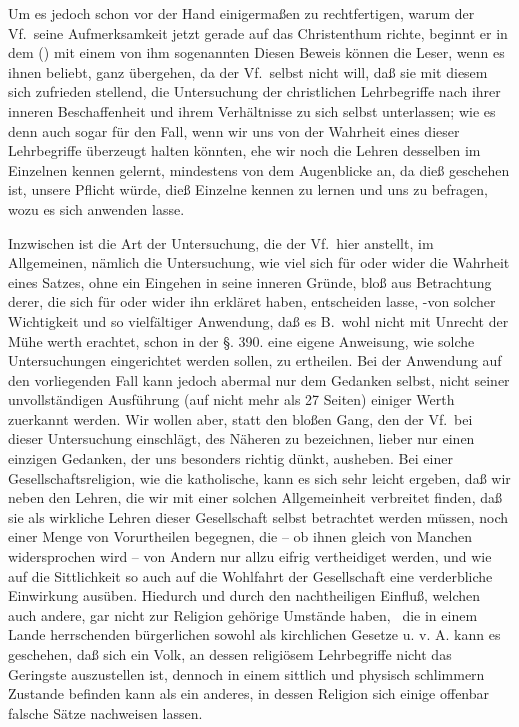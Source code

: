 Um es jedoch schon vor der Hand einigermaßen zu rechtfertigen, warum der Vf.\ seine Aufmerksamkeit jetzt gerade auf das Christenthum richte, beginnt er in dem  () mit einem von ihm sogenannten  Diesen Beweis können die Leser, wenn es ihnen beliebt, ganz übergehen, da der Vf.\ selbst nicht will, daß sie mit diesem sich zufrieden stellend, die Untersuchung der christlichen Lehrbegriffe nach ihrer inneren Beschaffenheit und ihrem Verhältnisse zu sich selbst unterlassen; wie es denn auch sogar für den Fall, wenn wir uns von der Wahrheit eines dieser Lehrbegriffe überzeugt halten könnten, ehe wir noch die Lehren desselben  im Einzelnen kennen gelernt, mindestens von dem Augenblicke an, da dieß geschehen ist, unsere Pflicht würde, dieß Einzelne kennen zu lernen und uns zu befragen, wozu es sich anwenden lasse. \par
Inzwischen ist die Art der Untersuchung, die der Vf.\ hier anstellt, im Allgemeinen, nämlich die Untersuchung, wie viel sich für oder wider die Wahrheit eines Satzes, ohne ein Eingehen in seine inneren Gründe, bloß aus Betrachtung derer, die sich für oder wider ihn erkläret haben, entscheiden lasse, -von solcher Wichtigkeit und so vielfältiger Anwendung, daß es B.\ wohl nicht mit Unrecht der Mühe werth erachtet, schon in der  §. 390. eine eigene Anweisung, wie solche Untersuchungen eingerichtet werden sollen, zu ertheilen. Bei der Anwendung auf den vorliegenden Fall kann jedoch abermal nur dem Gedanken selbst, nicht seiner unvollständigen Ausführung (auf nicht mehr als 27 Seiten) einiger Werth zuerkannt werden. Wir wollen aber, statt den bloßen Gang, den der Vf.\ bei dieser Untersuchung einschlägt, des Näheren zu bezeichnen, lieber nur einen einzigen Gedanken, der uns besonders richtig dünkt, ausheben. Bei einer Gesellschaftsreligion, wie die katholische, kann es sich sehr leicht ergeben, daß wir neben den Lehren, die wir mit einer solchen Allgemeinheit verbreitet finden, daß sie als wirkliche Lehren dieser Gesellschaft selbst betrachtet werden müssen, noch einer Menge von Vorurtheilen begegnen, die -- ob ihnen gleich von Manchen widersprochen wird -- von Andern nur allzu eifrig vertheidiget werden, und wie auf die Sittlichkeit so auch auf die Wohlfahrt der Gesellschaft eine verderbliche Einwirkung ausüben. Hiedurch und durch den nachtheiligen Einfluß, welchen auch andere, gar nicht zur Religion gehörige Umstände haben, \zB\ die in einem Lande herrschenden bürgerlichen sowohl als kirchlichen Gesetze u. v. A. kann es geschehen, daß sich ein Volk, an dessen religiösem Lehrbegriffe nicht das Geringste auszustellen ist, dennoch in einem sittlich und physisch schlimmern Zustande befinden kann als ein anderes, in dessen Religion sich einige offenbar falsche Sätze nachweisen lassen.  \par
